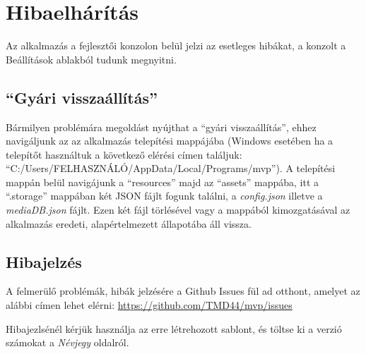 \section{Hibaelhárítás}
Az alkalmazás a fejlesztői konzolon belül jelzi az esetleges hibákat, a konzolt a Beállítások ablakból tudunk megnyitni.

\subsection{``Gyári visszaállítás''}
Bármilyen problémára megoldást nyújthat a ``gyári visszaállítás'', ehhez navigáljunk az az alkalmazás telepítési mappájába (Windows esetében ha a telepítőt használtuk a következő elérési címen találjuk: ``C:/Users/FELHASZNÁLÓ/AppData/Local/Programs/mvp''). A telepítési mappán belül navigájunk a ``resources'' majd az ``assets'' mappába, itt a ``.storage'' mappában két JSON fájlt fogunk találni, a {\it config.json} illetve a {\it mediaDB.json} fájlt. Ezen két fájl törlésével vagy a mappából kimozgatásával az alkalmazás eredeti, alapértelmezett állapotába áll vissza.

\subsection{Hibajelzés}
A felmerülő problémák, hibák jelzésére a Github Issues fül ad otthont, amelyet az alábbi címen lehet elérni: \url{https://github.com/TMD44/mvp/issues}

Hibajezlsénél kérjük használja az erre létrehozott sablont, és töltse ki a verzió számokat a {\it Névjegy} oldalról.
